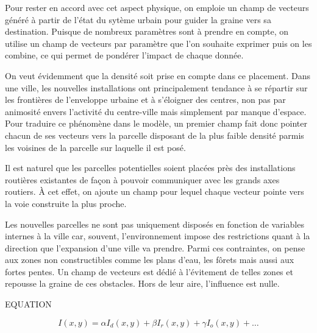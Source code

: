 \documentclass[12pt]{article}
\begin{document}
Pour rester en accord avec cet aspect physique, on emploie un champ de
vecteurs généré à partir de l'état du sytème urbain pour guider la
graine vers sa destination. Puisque de nombreux paramètres sont à
prendre en compte, on utilise un champ de vecteurs par paramètre que
l'on souhaite exprimer puis on les combine, ce qui permet de pondérer
l'impact de chaque donnée.

On veut évidemment que la densité soit prise en compte dans ce
placement. Dans une ville, les nouvelles installations ont
principalement tendance à se répartir sur les frontières de
l'enveloppe urbaine et à s'éloigner des centres, non pas par animosité
envers l'activité du centre-ville mais simplement par manque
d'espace. Pour traduire ce phénomène dans le modèle, un premier champ
fait donc pointer chacun de ses vecteurs vers la parcelle disposant de
la plus faible densité parmis les voisines de la parcelle sur laquelle
il est posé.

Il est naturel que les parcelles potentielles soient placées près des
installations routières existantes de façon à pouvoir communiquer avec
les grands axes routiers. À cet effet, on ajoute un champ pour lequel
chaque vecteur pointe vers la voie construite la plus proche.

Les nouvelles parcelles ne sont pas uniquement disposés en fonction de
variables internes à la ville car, souvent, l'environnement impose des
restrictions quant à la direction que l'expansion d'une ville va
prendre. Parmi ces contraintes, on pense aux zones non constructibles
comme les plans d'eau, les fôrets mais aussi aux fortes pentes. Un
champ de vecteurs est dédié à l'évitement de telles zones et repousse la
graine de ces obstacles. Hors de leur aire, l'influence est nulle.

EQUATION

\begin{equation*}
  I(x,y) = \alpha I_d(x,y) + \beta I_r(x,y) + \gamma I_o(x,y) + \dots
\end{equation*}
\end{document}
